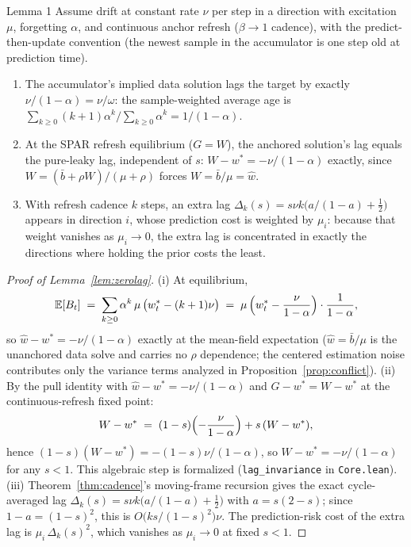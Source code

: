 \begin{restated}{Lemma 1}
Assume drift at constant rate $\nu$ per step in a direction with excitation $\mu$, forgetting $\alpha$, and continuous anchor refresh ($\beta \to 1$ cadence), with the predict-then-update convention (the newest sample in the accumulator is one step old at prediction time).
\begin{enumerate}
\item[(i)] The accumulator's implied data solution lags the target by exactly $\nu/(1-\alpha) = \nu/\omega$: the sample-weighted average age is
$\sum_{k \ge 0} (k+1)\alpha^k \big/ \sum_{k \ge 0}\alpha^k = 1/(1-\alpha)$.
\item[(ii)] At the SPAR refresh equilibrium ($G = W$), the anchored solution's lag equals the pure-leaky lag, independent of $s$: $W - w^* = -\nu/(1-\alpha)$ exactly, since $W = (\bar b + \rho W)/(\mu + \rho)$ forces $W = \bar b/\mu = \widehat w$.
\item[(iii)] With refresh cadence $k$ steps, an extra lag $\Delta_k(s) = s\nu k\bigl(a/(1-a)+\tfrac12\bigr)$ appears in direction $i$, whose prediction cost is weighted by $\mu_i$: because that weight vanishes as $\mu_i \to 0$, the extra lag is concentrated in exactly the directions where holding the prior costs the least.
\end{enumerate}
\end{restated}

\begin{proof}[Proof of Lemma~\ref{lem:zerolag}]
(i) At equilibrium,
\[
  \mathbb{E}[B_t]
  \;=\; \sum_{k \ge 0} \alpha^k\, \mu\,\bigl(w^*_t - (k+1)\nu\bigr)
  \;=\; \mu\,\Bigl(w^*_t - \frac{\nu}{1-\alpha}\Bigr)\cdot\frac{1}{1-\alpha},
\]
so $\widehat w - w^* = -\nu/(1-\alpha)$ exactly at the mean-field expectation ($\widehat w = \bar b/\mu$ is the unanchored data solve and carries no $\rho$ dependence; the centered estimation noise contributes only the variance terms analyzed in Proposition~\ref{prop:conflict}).
(ii) By the pull identity with $\widehat w - w^* = -\nu/(1-\alpha)$ and $G - w^* = W - w^*$ at the continuous-refresh fixed point:
\[
  W - w^* \;=\; (1 - s)\Bigl(-\frac{\nu}{1-\alpha}\Bigr) + s\,(W - w^*),
\]
hence $(1 - s)(W - w^*) = -(1-s)\nu/(1-\alpha)$, so $W - w^* = -\nu/(1-\alpha)$ for any $s < 1$.
This algebraic step is formalized (\texttt{lag\_invariance} in \texttt{Core.lean}).
(iii) Theorem~\ref{thm:cadence}'s moving-frame recursion gives the exact cycle-averaged lag $\Delta_k(s) = s\nu k\bigl(a/(1-a)+\tfrac12\bigr)$ with $a=s(2-s)$; since $1-a=(1-s)^2$, this is $O\bigl(k s/(1-s)^2\bigr)\nu$.
The prediction-risk cost of the extra lag is $\mu_i\,\Delta_k(s)^2$, which vanishes as $\mu_i \to 0$ at fixed $s < 1$.
\end{proof}

